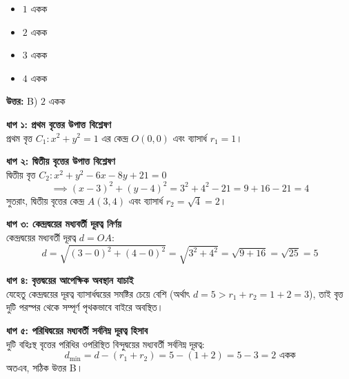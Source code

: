 \documentclass[12pt, a4paper]{article}
\begin{document}
\begin{itemize}[label={}, leftmargin=1cm, itemsep=0.5em]
    \item[\textbf{A)}] $1$ একক
    \item[\textbf{B)}] $2$ একক
    \item[\textbf{C)}] $3$ একক
    \item[\textbf{D)}] $4$ একক
\end{itemize}

\vspace{0.5em}
\begin{tcolorbox}[answerbox]
    \textbf{\color{success} উত্তর:} B) $2$ একক
\end{tcolorbox}
\vspace{1em}

\begin{tcolorbox}[solutionbox={সমাধান (Solution)}]
    \noindent
    \textbf{ধাপ ১: প্রথম বৃত্তের উপাত্ত বিশ্লেষণ} \\
    প্রথম বৃত্ত $C_1: x^2 + y^2 = 1$ এর কেন্দ্র $O(0,0)$ এবং ব্যাসার্ধ $r_1 = 1$।
    
    \vspace{0.5em}
    \noindent\textbf{ধাপ ২: দ্বিতীয় বৃত্তের উপাত্ত বিশ্লেষণ} \\
    দ্বিতীয় বৃত্ত $C_2: x^2 + y^2 - 6x - 8y + 21 = 0$
    \[ \implies (x - 3)^2 + (y - 4)^2 = 3^2 + 4^2 - 21 = 9 + 16 - 21 = 4 \]
    সুতরাং, দ্বিতীয় বৃত্তের কেন্দ্র $A(3, 4)$ এবং ব্যাসার্ধ $r_2 = \sqrt{4} = 2$।
    
    \vspace{0.5em}
    \noindent\textbf{ধাপ ৩: কেন্দ্রদ্বয়ের মধ্যবর্তী দূরত্ব নির্ণয়} \\
    কেন্দ্রদ্বয়ের মধ্যবর্তী দূরত্ব $d = OA$:
    \[ d = \sqrt{(3 - 0)^2 + (4 - 0)^2} = \sqrt{3^2 + 4^2} = \sqrt{9 + 16} = \sqrt{25} = 5 \]
    
    \vspace{0.5em}
    \noindent\textbf{ধাপ ৪: বৃত্তদ্বয়ের আপেক্ষিক অবস্থান যাচাই} \\
    যেহেতু কেন্দ্রদ্বয়ের দূরত্ব ব্যাসার্ধদ্বয়ের সমষ্টির চেয়ে বেশি (অর্থাৎ $d = 5 > r_1 + r_2 = 1 + 2 = 3$), তাই বৃত্ত দুটি পরস্পর থেকে সম্পূর্ণ পৃথকভাবে বাইরে অবস্থিত।
    
    \vspace{0.5em}
    \noindent\textbf{ধাপ ৫: পরিধিদ্বয়ের মধ্যবর্তী সর্বনিম্ন দূরত্ব হিসাব} \\
    দুটি বহিঃস্থ বৃত্তের পরিধির ওপরিস্থিত বিন্দুদ্বয়ের মধ্যবর্তী সর্বনিম্ন দূরত্ব:
    \[ d_{\min} = d - (r_1 + r_2) = 5 - (1 + 2) = 5 - 3 = 2 \text{ একক} \]
    অতএব, সঠিক উত্তর B।
\end{tcolorbox}
\end{document}

